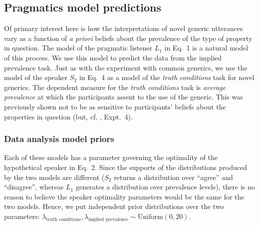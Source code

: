\documentclass[10pt,letterpaper]{article}
\newcommand{\red}[1]{\textcolor{Red}{#1}}
\begin{document}

\subsection{Pragmatics model predictions}


Of primary interest here is how the interpretations of novel generic utterances vary as a function of \emph{a priori} beliefs about the prevalence of the type of property in question.
The model of the pragmatic listener $L_1$ in Eq.~1 is a natural model of this process.
We use this model to predict the data from the implied prevalence task.
Just as with the experiment with common generics, we use the model of the speaker $S_2$ in Eq.~4 as a model of the \emph{truth conditions} task for novel generics.
The dependent measure for the \emph{truth conditions} task is \emph{average prevalence} at which the participants assent to the use of the generic. 
This was previously shown not to be as sensitive to participants' beliefs about the properties in question (but, cf. , Expt.~4).

\subsubsection{Data analysis model priors}
\label{sec:bdapriors4}

Each of these models has a parameter governing the optimality of the hypothetical speaker in Eq.~2. 
Since the supports of the distributions produced by the two models are different ($S_2$ returns a distribution over ``agree'' and ``disagree'', whereas $L_1$ generates a distribution over prevalence levels), there is no reason to believe the speaker optimality parameters would be the same for the two models. 
Hence, we put independent prior distributions over the two parameters: $\lambda_{\text{truth conditions}}, \lambda_{\text{implied prevalence}} \sim \text{Uniform}(0, 20)$.
\end{document}
